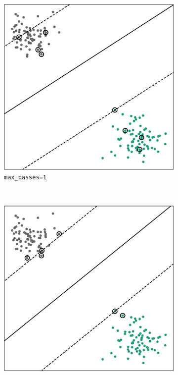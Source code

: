 \begin{figure}
    \centering
    \begin{subfigure}[b]{0.32\textwidth}
        \includegraphics[width=\textwidth]{media_saved/own_test_mpasses_1.pdf}
        \caption{\texttt{max\_passes=1}}
        \label{fig:max_passs_1}
    \end{subfigure}
    ~ %
    \begin{subfigure}[b]{0.32\textwidth}
        \includegraphics[width=\textwidth]{media_saved/own_test_mpasses_15.pdf}

\end{subfigure}
\end{figure}
